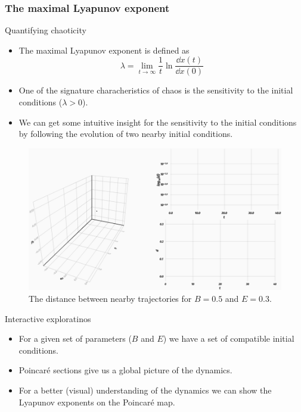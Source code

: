 \documentclass{beamer}
\begin{document}
\subsubsection{The maximal Lyapunov exponent}


\begin{frame}{Quantifying chaoticity}
	\begin{itemize}
		\item The maximal Lyapunov exponent is defined as
		\[
			\lambda = \lim\limits_{t \to \infty} \frac{1}{t} \ln{\frac{\dd{x}(t)}{\dd{x}(0)}}
		\]
		\item One of the signature characheristics of chaos is the sensitivity to the initial conditions	(\(\lambda > 0\)).
		\item We can get some intuitive insight for the sensitivity to
		the initial conditions by following the evolution of two nearby
		initial conditions.
	\end{itemize}
\end{frame}



\begin{frame}
	\begin{figure}
		\includegraphics[width=\textwidth]{dist-with-log}
		\caption{The distance between nearby trajectories for \(B=0.5\)
		and \(E=0.3\).}
	\end{figure}
\end{frame}


\begin{frame}{Interactive exploratinos}
	\begin{itemize}
		\item For a given set of parameters ($B$ and $E$) we have
		a set of compatible initial conditions.
		\item Poincaré sections give us a global picture of the
		dynamics.
		\item For a better (visual) understanding of the dynamics
		we can show the Lyapunov exponents on the Poincaré map.
	\end{itemize}
\end{frame}
\end{document}
